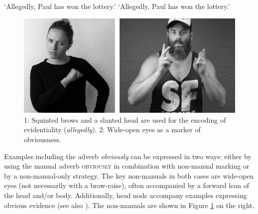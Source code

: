 \begin{exe}
\ex\begin{xlist}\label{ex:allegedly}
\ex\label{ex:allegedlyb} 
\glt `Allegedly, Paul has won the lottery.'
\ex\label{ex:allegedlya}  
\glt `Allegedly, Paul has won the lottery.'
\end{xlist}
\end{exe}

\begin{figure}[bt]
\centering
	\includegraphics[width=1.0\textwidth]{allegedly-evidential3sw.jpg}
	\caption{1: Squinted brows and a slanted head are used for the encoding of evidentiality (\textit{allegedly}). 2: Wide-open eyes as a marker of obviousness.}
	\label{fig:allegedly}
\end{figure}

\noindent Examples including the adverb \textit{obviously} can be expressed in two ways: either by using the manual adverb \textsc{obviously} in combination with non-manual marking or by a non-manual-only strategy. The key non-manuals in both cases are wide-open eyes (not necessarily with a brow-raise), often accompanied by a forward lean of the head and/or body. Additionally, head nods accompany examples expressing obvious evidence (see also \citealt[133]{herrmann2013modal}). The non-manuals are shown in Figure \ref{fig:allegedly} on the right. 


